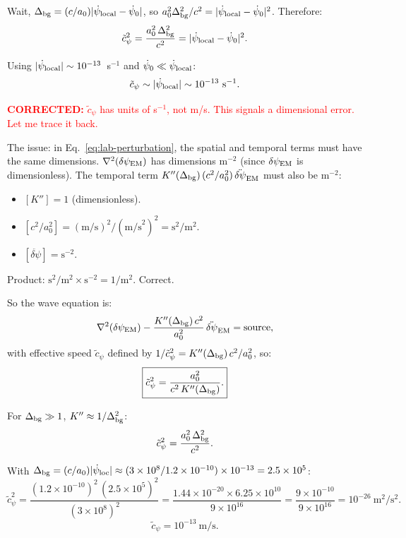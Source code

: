 \documentclass[11pt]{article}
\newcommand{\ee}[1]{\times 10^{#1}}
\newcommand{\dpsiEM}{\delta\psi_{\rm EM}}
\newcommand{\corrected}[1]{\textcolor{red}{\textbf{CORRECTED:} #1}}
\theoremstyle{definition}
\theoremstyle{remark}
\begin{document}
Wait, $\Delta_{\rm bg} = (c/a_0)|\dot\psi_{\rm local} - \dot\psi_0|$,
so $a_0^2\Delta_{\rm bg}^2/c^2 = |\dot\psi_{\rm local} - \dot\psi_0|^2$.
Therefore:
\begin{equation}
\tilde{c}_\psi^2 = \frac{a_0^2\,\Delta_{\rm bg}^2}{c^2}
= |\dot\psi_{\rm local} - \dot\psi_0|^2.
\end{equation}

Using $|\dot\psi_{\rm local}| \sim 10^{-13}$~s$^{-1}$ and
$\dot\psi_0 \ll \dot\psi_{\rm local}$:
\begin{equation}
\tilde{c}_\psi \sim |\dot\psi_{\rm local}| \sim 10^{-13}~\text{s}^{-1}.
\end{equation}

\corrected{$\tilde{c}_\psi$ has units of s$^{-1}$, not m/s. This
signals a dimensional error. Let me trace it back.}

The issue: in Eq.~\eqref{eq:lab-perturbation}, the spatial and
temporal terms must have the same dimensions. $\nabla^2(\dpsiEM)$ has
dimensions m$^{-2}$ (since $\dpsiEM$ is dimensionless). The temporal
term $K''(\Delta_{\rm bg})\,(c^2/a_0^2)\,\ddot{\delta\psi}_{\rm EM}$
must also be m$^{-2}$:
\begin{itemize}
\item $[K''] = 1$ (dimensionless).
\item $[c^2/a_0^2] = (\text{m/s})^2/(\text{m/s}^2)^2
  = \text{s}^2/\text{m}^2$.
\item $[\ddot{\delta\psi}] = \text{s}^{-2}$.
\end{itemize}
Product: $\text{s}^2/\text{m}^2 \times \text{s}^{-2} = 1/\text{m}^2$.
Correct.

So the wave equation is:
\begin{equation}
\nabla^2(\dpsiEM) - \frac{K''(\Delta_{\rm bg})\,c^2}{a_0^2}\,
\ddot{\delta\psi}_{\rm EM} = \text{source},
\end{equation}
with effective speed $\tilde{c}_\psi$ defined by $1/\tilde{c}_\psi^2
= K''(\Delta_{\rm bg})\,c^2/a_0^2$, so:
\begin{equation}
\boxed{
\tilde{c}_\psi^2 = \frac{a_0^2}{c^2\,K''(\Delta_{\rm bg})}.
}
\label{eq:cpsi-general}
\end{equation}

For $\Delta_{\rm bg} \gg 1$, $K'' \approx 1/\Delta_{\rm bg}^2$:
\begin{equation}
\tilde{c}_\psi^2 = \frac{a_0^2\,\Delta_{\rm bg}^2}{c^2}.
\end{equation}

With $\Delta_{\rm bg} = (c/a_0)|\dot\psi_{\rm loc}|
\approx (3\ee{8}/1.2\ee{-10})\times 10^{-13} = 2.5\ee{5}$:
\begin{equation}
\tilde{c}_\psi^2 = \frac{(1.2\ee{-10})^2\,(2.5\ee{5})^2}
{(3\ee{8})^2}
= \frac{1.44\ee{-20}\times 6.25\ee{10}}{9\ee{16}}
= \frac{9\ee{-10}}{9\ee{16}} = 10^{-26}~\text{m}^2/\text{s}^2.
\end{equation}
\begin{equation}
\tilde{c}_\psi = 10^{-13}~\text{m/s}.
\end{equation}
\end{document}
